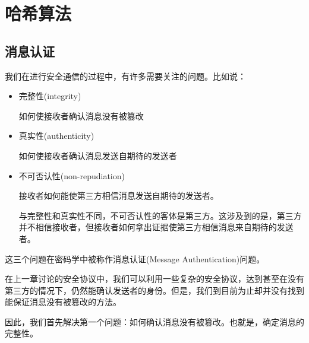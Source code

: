 \chapter{哈希算法}
\section{消息认证}
我们在进行安全通信的过程中，有许多需要关注的问题。比如说：
\begin{itemize}
    \item 完整性(integrity)\par
    如何使接收者确认消息没有被篡改
    \item 真实性(authenticity)\par
    如何使接收者确认消息发送自期待的发送者
    \item 不可否认性(non-repudiation)\par
    接收者如何能使第三方相信消息发送自期待的发送者。\par
    与完整性和真实性不同，不可否认性的客体是第三方。这涉及到的是，第三方并不相信接收者，但接收者如何拿出证据使第三方相信消息来自期待的发送者。
\end{itemize}

这三个问题在密码学中被称作消息认证(Message Authentication)问题。\par
在上一章讨论的安全协议中，我们可以利用一些复杂的安全协议，达到甚至在没有第三方的情况下，仍然能确认发送者的身份。但是，我们到目前为止却并没有找到能保证消息没有被篡改的方法。\par
因此，我们首先解决第一个问题：如何确认消息没有被篡改。也就是，确定消息的完整性。
